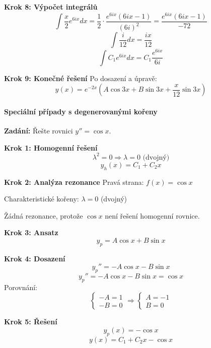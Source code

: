 \begin{example}
\vspace{1\baselineskip}

\noindent\textbf{Krok 8: Výpočet integrálů}
\[
\int \frac{x}{2}e^{6ix} dx = \frac{1}{2} \cdot \frac{e^{6ix}(6ix - 1)}{(6i)^2} = \frac{e^{6ix}(6ix - 1)}{-72}
\]
\[
\int \frac{i}{12} dx = \frac{ix}{12}
\]
\[
\int C_1 e^{6ix} dx = C_1 \frac{e^{6ix}}{6i}
\]

\vspace{1\baselineskip}

\noindent\textbf{Krok 9: Konečné řešení}
Po dosazení a úpravě:
\[
y(x) = e^{-2x} \left( A\cos 3x + B\sin 3x + \frac{x}{12}\sin 3x \right)
\]

\end{example}

\paragraph{Speciální případy s degenerovanými kořeny}

\begin{example}
\label{ex:dvojny-nulovy-koren}

\noindent\textbf{Zadání:} Řešte rovnici $y'' = \cos x$.

\vspace{1.5\baselineskip}

\noindent\textbf{Krok 1: Homogenní řešení}
\[
\lambda^2 = 0 \Rightarrow \lambda = 0 \text{ (dvojný)}
\]
\[
y_h(x) = C_1 + C_2 x
\]

\vspace{1\baselineskip}

\noindent\textbf{Krok 2: Analýza rezonance}
Pravá strana: $f(x) = \cos x$

Charakteristické kořeny: $\lambda = 0$ (dvojný)

Žádná rezonance, protože $\cos x$ není řešení homogenní rovnice.

\vspace{1\baselineskip}

\noindent\textbf{Krok 3: Ansatz}
\[
y_p = A\cos x + B\sin x
\]

\vspace{1\baselineskip}

\noindent\textbf{Krok 4: Dosazení}
\[
y_p'' = -A\cos x - B\sin x
\]
\[
y_p'' = -A\cos x - B\sin x = \cos x
\]
Porovnání:
\[
\begin{cases}
-A = 1 \\
-B = 0
\end{cases}
\Rightarrow
\begin{cases}
A = -1 \\
B = 0
\end{cases}
\]

\vspace{1\baselineskip}

\noindent\textbf{Krok 5: Řešení}
\[
y_p(x) = -\cos x
\]
\[
y(x) = C_1 + C_2 x - \cos x
\]

\end{example}

